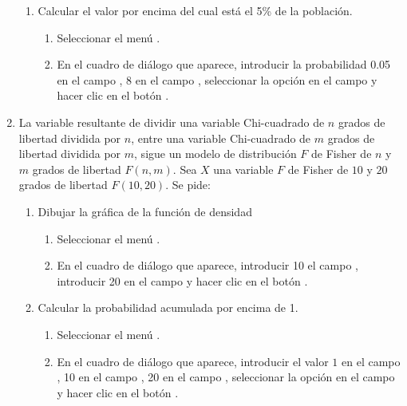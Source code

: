 \begin{enumerate}[leftmargin=*]
\begin{enumerate}
\item Calcular el valor por encima del cual está el 5\% de la población. 
\begin{indicacion}{
\begin{enumerate}
\item Seleccionar el menú .
\item En el cuadro de diálogo que aparece, introducir la probabilidad 0.05 en el campo , 8 en el
campo , seleccionar la opción  en el campo  y hacer
clic en el botón .
\end{enumerate}}
\end{indicacion}
\end{enumerate}

\item La variable resultante de dividir una variable Chi-cuadrado de $n$ grados de libertad dividida por $n$, entre una
variable Chi-cuadrado de $m$ grados de libertad dividida por $m$, sigue un modelo de distribución $F$ de Fisher de $n$ y
$m$ grados de libertad $F(n,m)$. 
Sea $X$ una variable $F$ de Fisher de $10$ y $20$ grados de libertad $F(10,20)$. 
Se pide:
\begin{enumerate}
\item Dibujar la gráfica de la función de densidad
\begin{indicacion}{
\begin{enumerate}
\item Seleccionar el menú .
\item En el cuadro de diálogo que aparece, introducir 10 el campo , introducir 20 en el campo  y hacer clic en el botón .
\end{enumerate}}
\end{indicacion}

\item Calcular la probabilidad acumulada por encima de 1. 
\begin{indicacion}{
\begin{enumerate}
\item Seleccionar el menú .
\item En el cuadro de diálogo que aparece, introducir el valor $1$ en el campo , 10 en el
campo , 20 en el campo , seleccionar
la opción  en el campo  y hacer clic en el botón .
\end{enumerate}}
\end{indicacion}


\end{enumerate}
\end{enumerate}
